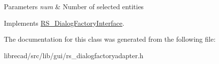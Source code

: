\begin{DoxyParams}{Parameters}
{\em num} & Number of selected entities \\
\hline
\end{DoxyParams}


Implements \hyperlink{classRS__DialogFactoryInterface_a8c7c8945b1a3f01d8fc377bc1a8699ed}{R\-S\-\_\-\-Dialog\-Factory\-Interface}.



The documentation for this class was generated from the following file\-:\begin{DoxyCompactItemize}
\item 
librecad/src/lib/gui/rs\-\_\-dialogfactoryadapter.\-h\end{DoxyCompactItemize}
